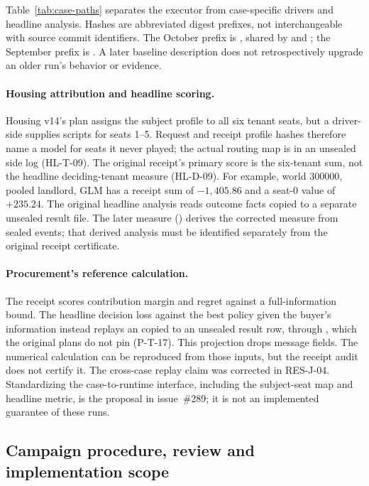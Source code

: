 Table~\ref{tab:case-paths} separates the executor from case-specific
drivers and headline analysis. Hashes are abbreviated digest prefixes,
not interchangeable with source commit identifiers. The October
 prefix is , shared by
 and ; the September prefix is
. A later baseline description does not retrospectively
upgrade an older run's behavior or evidence.



\paragraph{Housing attribution and headline scoring.}
Housing v14's plan assigns the subject profile to all six tenant seats,
but a driver-side  supplies scripts for seats
1--5. Request and receipt profile hashes therefore name a model for
seats it never played; the actual routing map is in an unsealed side
log (HL-T-09). The original receipt's primary score is the six-tenant
sum, not the headline deciding-tenant measure (HL-D-09). For example,
world 300000, pooled landlord, GLM has a receipt sum of
$-1{,}405.86$ and a seat-0 value of $+235.24$. The original headline
analysis reads outcome facts copied to a separate unsealed result file.
The later  measure () derives
the corrected measure from sealed events; that derived analysis must
be identified separately from the original receipt certificate.

\paragraph{Procurement's reference calculation.}
The receipt scores contribution margin and regret against a
full-information bound. The headline decision loss against the best
policy given the buyer's information instead replays an
 copied to an unsealed result row, through
, which the original plans do not pin
(P-T-17). This projection drops message fields. The numerical
calculation can be reproduced from those inputs, but the receipt audit
does not certify it. The cross-case replay claim was corrected in
RES-J-04. Standardizing the case-to-runtime interface,
including the subject-seat map and headline metric, is the proposal in
issue~\#289; it is not an implemented guarantee of these runs.

\subsection{Campaign procedure, review and implementation scope}
\label{app:runtime-qc}

